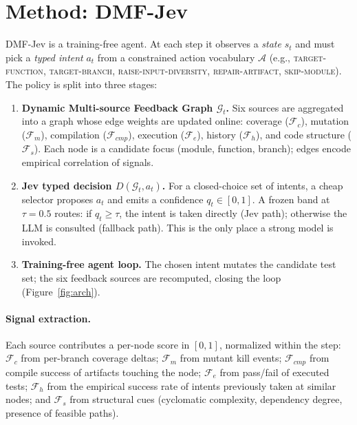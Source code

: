 \documentclass[11pt]{article}
\begin{document}
\section{Method: DMF-Jev}
\label{sec:method}
DMF-Jev is a training-free agent. At each step it observes a \emph{state} $s_t$ and must pick a \emph{typed intent} $a_t$ from a constrained action vocabulary $\mathcal{A}$ (e.g., \textsc{target-function}, \textsc{target-branch}, \textsc{raise-input-diversity}, \textsc{repair-artifact}, \textsc{skip-module}). The policy is split into three stages:
\begin{enumerate}
  \item \textbf{Dynamic Multi-source Feedback Graph $\mathcal{G}_t$.} Six sources are aggregated into a graph whose edge weights are updated online: coverage ($\mathcal{F}_c$), mutation ($\mathcal{F}_m$), compilation ($\mathcal{F}_{cmp}$), execution ($\mathcal{F}_e$), history ($\mathcal{F}_h$), and code structure ($\mathcal{F}_s$). Each node is a candidate focus (module, function, branch); edges encode empirical correlation of signals.
  \item \textbf{Jev typed decision $D(\mathcal{G}_t, a_t)$.} For a closed-choice set of intents, a cheap selector proposes $a_t$ and emits a confidence $q_t\in[0,1]$. A frozen band at $\tau=0.5$ routes: if $q_t\ge \tau$, the intent is taken directly (Jev path); otherwise the LLM is consulted (fallback path). This is the only place a strong model is invoked.
  \item \textbf{Training-free agent loop.} The chosen intent mutates the candidate test set; the six feedback sources are recomputed, closing the loop (Figure~\ref{fig:arch}).
\end{enumerate}

\paragraph{Signal extraction.}
Each source contributes a per-node score in $[0,1]$, normalized within the step: $\mathcal{F}_c$ from per-branch coverage deltas; $\mathcal{F}_m$ from mutant kill events; $\mathcal{F}_{cmp}$ from compile success of artifacts touching the node; $\mathcal{F}_e$ from pass/fail of executed tests; $\mathcal{F}_h$ from the empirical success rate of intents previously taken at similar nodes; and $\mathcal{F}_s$ from structural cues (cyclomatic complexity, dependency degree, presence of feasible paths).
\end{document}
